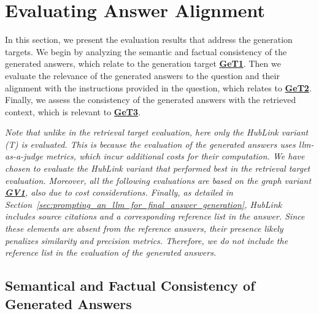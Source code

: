 
\section{Evaluating Answer Alignment}
\label{sec:evaluating_answer_alignment}

In this section, we present the evaluation results that address the generation targets. We begin by analyzing the semantic and factual consistency of the generated answers, which relate to the generation target \hyperref[sec:evaluation_goals_and_metrics]{\textbf{GeT1}}. Then we evaluate the relevance of the generated answers to the question and their alignment with the instructions provided in the question, which relates to \hyperref[sec:evaluation_goals_and_metrics]{\textbf{GeT2}}. Finally, we assess the consistency of the generated answers with the retrieved context, which is relevant to \hyperref[sec:evaluation_goals_and_metrics]{\textbf{GeT3}}. 

\textit{Note that unlike in the retrieval target evaluation, here only the HubLink variant (T) is evaluated. This is because the evaluation of the generated answers uses \gls{llm}-as-a-judge metrics, which incur additional costs for their computation. We have chosen to evaluate the HubLink variant that performed best in the retrieval target evaluation. Moreover, all the following evaluations are based on the graph variant \hyperref[enum:gv1]{\textbf{GV1}}, also due to cost considerations. Finally, as detailed in Section~\ref{sec:prompting_an_llm_for_final_answer_generation}, HubLink includes source citations and a corresponding reference list in the answer. Since these elements are absent from the reference answers, their presence likely penalizes similarity and precision metrics. Therefore, we do not include the reference list in the evaluation of the generated answers.}



\subsection{Semantical and Factual Consistency of Generated Answers}
\label{sec:semantical_and_factual_consistency}

